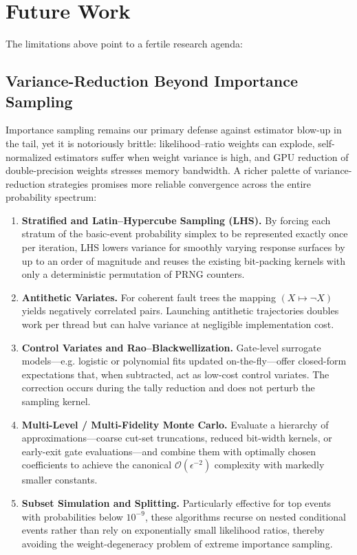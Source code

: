 \section{Future Work}
\label{sec:future_work}

The limitations above point to a fertile research agenda:

\subsection{Variance-Reduction Beyond Importance Sampling}
Importance sampling remains our primary defense against estimator blow-up in the tail, yet it is notoriously brittle: likelihood–ratio weights can explode, self-normalized estimators suffer when weight variance is high, and GPU reduction of double-precision weights stresses memory bandwidth.  A richer palette of variance-reduction strategies promises more reliable convergence across the entire probability spectrum:

\begin{enumerate}
  \item \textbf{Stratified and Latin–Hypercube Sampling (LHS).}  By forcing each stratum of the basic-event probability simplex to be represented exactly once per iteration, LHS lowers variance for smoothly varying response surfaces by up to an order of magnitude and reuses the existing bit-packing kernels with only a deterministic permutation of PRNG counters.
  \item \textbf{Antithetic Variates.}  For coherent fault trees the mapping $(X\mapsto \lnot X)$ yields negatively correlated pairs.  Launching antithetic trajectories doubles work per thread but can halve variance at negligible implementation cost.
  \item \textbf{Control Variates and Rao–Blackwellization.}  Gate-level surrogate models—e.g. logistic or polynomial fits updated on-the-fly—offer closed-form expectations that, when subtracted, act as low-cost control variates.  The correction occurs during the tally reduction and does not perturb the sampling kernel.
  \item \textbf{Multi-Level / Multi-Fidelity Monte Carlo.}  Evaluate a hierarchy of approximations—coarse cut-set truncations, reduced bit-width kernels, or early-exit gate evaluations—and combine them with optimally chosen coefficients to achieve the canonical $\mathcal{O}(\epsilon^{-2})$ complexity with markedly smaller constants.
  \item \textbf{Subset Simulation and Splitting.}  Particularly effective for top events with probabilities below $10^{-9}$, these algorithms recurse on nested conditional events rather than rely on exponentially small likelihood ratios, thereby avoiding the weight-degeneracy problem of extreme importance sampling.
\end{enumerate}

